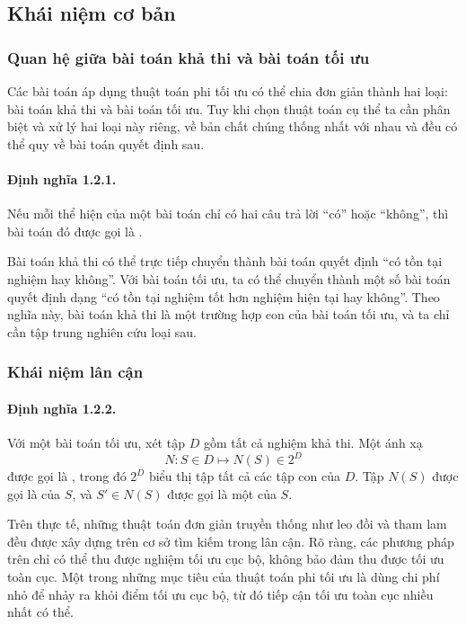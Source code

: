 \documentclass[11pt]{article}
\begin{document}
\subsection{Khái niệm cơ bản}

\subsubsection{Quan hệ giữa bài toán khả thi và bài toán tối ưu}

Các bài toán áp dụng thuật toán phi tối ưu có thể chia đơn giản thành hai
loại: bài toán khả thi và bài toán tối ưu. Tuy khi chọn thuật toán cụ thể ta
cần phân biệt và xử lý hai loại này riêng, về bản chất chúng thống nhất với
nhau và đều có thể quy về bài toán quyết định sau.

\paragraph{Định nghĩa 1.2.1.}
Nếu mỗi thể hiện của một bài toán chỉ có hai câu trả lời ``có'' hoặc
``không'', thì bài toán đó được gọi là .

Bài toán khả thi có thể trực tiếp chuyển thành bài toán quyết định ``có tồn
tại nghiệm hay không''. Với bài toán tối ưu, ta có thể chuyển thành một số bài
toán quyết định dạng ``có tồn tại nghiệm tốt hơn nghiệm hiện tại hay không''.
Theo nghĩa này, bài toán khả thi là một trường hợp con của bài toán tối ưu, và
ta chỉ cần tập trung nghiên cứu loại sau.

\subsubsection{Khái niệm lân cận}

\paragraph{Định nghĩa 1.2.2.}
Với một bài toán tối ưu, xét tập \(D\) gồm tất cả nghiệm khả thi. Một ánh xạ
\[
  N: S\in D \longmapsto N(S)\in 2^D
\]
được gọi là , trong đó \(2^D\) biểu thị tập tất cả các
tập con của \(D\). Tập \(N(S)\) được gọi là  của \(S\), và
\(S'\in N(S)\) được gọi là một  của \(S\).

Trên thực tế, những thuật toán đơn giản truyền thống như leo đồi và tham lam
đều được xây dựng trên cơ sở tìm kiếm trong lân cận. Rõ ràng, các phương pháp
trên chỉ có thể thu được nghiệm tối ưu cục bộ, không bảo đảm thu được tối ưu
toàn cục. Một trong những mục tiêu của thuật toán phi tối ưu là dùng chi phí
nhỏ để nhảy ra khỏi điểm tối ưu cục bộ, từ đó tiếp cận tối ưu toàn cục nhiều
nhất có thể.
\end{document}
